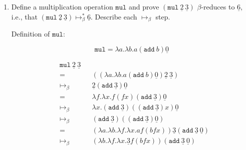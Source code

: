 \documentclass[11pt]{article}
\begin{document}
\begin{enumerate}
\begin{enumerate}
		            \newpage
		      \item Define a multiplication operation $\texttt{mul}$ and prove $(\texttt{mul} \: \underline{2} \: \underline{3})$ $\beta$-reduces to $\underline{6}$, i.e., that $(\texttt{mul} \: \underline{2} \: \underline{3}) \mapsto^*_\beta \underline{6}$. Describe each $\mapsto_\beta$ step.


		            Definition of $ \texttt{mul}$:

		            $$
			            \texttt{mul} = \lambda a. \lambda b. a ( \texttt{add} \: b) \underline{0}
		            $$

		            \begin{align*}
			             &  & \texttt{mul} \: \underline{2} \: \underline{3} &                                                                                                                                        \\
			             &  & =                                              &   & (( \lambda a. \lambda b. a ( \texttt{add} \: b) \underline{0} ) \underline{2} \: \underline{3} )                                 & \\
			             &  & \mapsto_\beta                                  &   & \underline{2} ( \texttt{add}  \:\underline{3} ) \underline{0}                                                                    & \\
			             &  & =                                              &   & \lambda f. \lambda x. f( f x)( \texttt{add}  \:\underline{3} ) \underline{0}                                                     & \\
			             &  & \mapsto_\beta                                  &   & \lambda x. ( \texttt{add}  \:\underline{3} )(( \texttt{add}  \:\underline{3} ) x) \underline{0}                                  & \\
			             &  & \mapsto_\beta                                  &   & ( \texttt{add}  \:\underline{3} )(( \texttt{add} \: \underline{3} ) \underline{0} )                                              & \\
			             &  & =                                              &   & ( \lambda a. \lambda b. \lambda f. \lambda x. a f ( b f x)) \underline{3} ( \texttt{add}  \:\underline{3}  \:\underline{0} )     & \\
			             &  & \mapsto_\beta                                  &   & ( \lambda b. \lambda f. \lambda x. \underline{3} f( b f x))( \texttt{add}  \:\underline{3}  \:\underline{0} )                    & \\

\end{align*}
\end{enumerate}
\end{enumerate}
\end{document}
